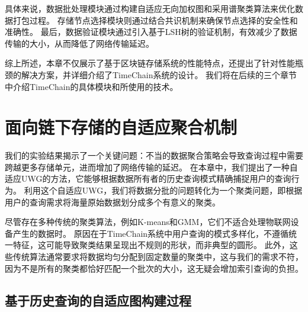 具体来说，数据批处理模块通过构建自适应无向加权图和采用谱聚类算法来优化数据打包过程。
存储节点选择模块则通过结合共识机制来确保节点选择的安全性和准确性。
最后，数据验证模块通过引入基于LSH树的验证机制，有效减少了数据传输的大小，从而降低了网络传输延迟。

综上所述，本章不仅展示了基于区块链存储系统的性能特点，还提出了针对性能瓶颈的解决方案，并详细介绍了TimeChain系统的设计。
我们将在后续的三个章节中介绍TimeChain的具体模块和所使用的技术。

\chapter{面向链下存储的自适应聚合机制}
\label{sec:packaging}
我们的实验结果揭示了一个关键问题：不当的数据聚合策略会导致查询过程中需要跨越更多存储单元，进而增加了网络传输的延迟。
在本章中，我们提出了一种自适应UWG的方法，它能够根据数据所有者的历史查询模式精确捕捉用户的查询行为。
利用这个自适应UWG，我们将数据分批的问题转化为一个聚类问题，即根据用户的查询需求将海量原始数据划分成多个有意义的聚类。

尽管存在多种传统的聚类算法，例如K-means和GMM，它们不适合处理物联网设备产生的数据时。
原因在于TimeChain系统中用户查询的模式多样化，不遵循统一特征，这可能导致聚类结果呈现出不规则的形状，而非典型的圆形。
此外，这些传统算法通常要求将数据均匀分配到固定数量的聚类中，这与我们的需求不符，因为不是所有的聚类都恰好匹配一个批次的大小，这无疑会增加索引查询的负担。

\section{基于历史查询的自适应图构建过程}
\label{sec:UWG}


